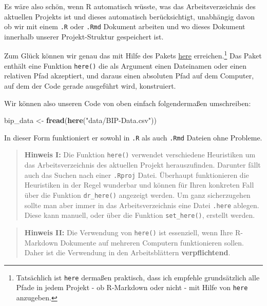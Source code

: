 \documentclass[]{tufte-book}
\newenvironment{Shaded}{}{}
\newcommand{\KeywordTok}[1]{\textcolor[rgb]{0.00,0.44,0.13}{\textbf{#1}}}
\newcommand{\StringTok}[1]{\textcolor[rgb]{0.25,0.44,0.63}{#1}}
\newcommand{\NormalTok}[1]{#1}
\begin{document}
Es wäre also schön, wenn R automatisch wüsste, was das
Arbeitsverzeichnis des aktuellen Projekts ist und dieses automatisch
berücksichtigt, unabhängig davon ob wir mit einem \texttt{.R} oder
\texttt{.Rmd} Dokument arbeiten und wo dieses Dokument innerhalb unserer
Projekt-Struktur gespeichert ist.

Zum Glück können wir genau das mit Hilfe des Pakets
\href{https://github.com/jennybc/here_here}{here} erreichen.\footnote{Tatsächlich
  ist \texttt{here} dermaßen praktisch, dass ich empfehle grundsätzlich
  alle Pfade in jedem Projekt - ob R-Markdown oder nicht - mit Hilfe von
  \texttt{here} anzugeben.} Das Paket enthält eine Funktion
\texttt{here()} die als Argument einen Dateinamen oder einen relativen
Pfad akzeptiert, und daraus einen absoluten Pfad auf dem Computer, auf
dem der Code gerade ausgeführt wird, konstruiert.

Wir können also unseren Code von oben einfach folgendermaßen
umschreiben:

\begin{Shaded}
\begin{Highlighting}[]
\NormalTok{bip_data <-}\StringTok{ }\KeywordTok{fread}\NormalTok{(}\KeywordTok{here}\NormalTok{(}\StringTok{"data/BIP-Data.csv"}\NormalTok{))}
\end{Highlighting}
\end{Shaded}

In dieser Form funktioniert er sowohl in \texttt{.R} als auch
\texttt{.Rmd} Dateien ohne Probleme.

\begin{quote}
\textbf{Hinweis I:} Die Funktion \texttt{here()} verwendet verschiedene
Heuristiken um das Arbeitsverzeichnis des aktuellen Projekt
herauszufinden. Darunter fällt auch das Suchen nach einer
\texttt{.Rproj} Datei. Überhaupt funktionieren die Heuristiken in der
Regel wunderbar und können für Ihren konkreten Fall über die Funktion
\texttt{dr\_here()} angezeigt werden. Um ganz sicherzugehen sollte man
aber immer in das Arbeitsverzeichnis eine Datei \texttt{.here} ablegen.
Diese kann manuell, oder über die Funktion \texttt{set\_here()},
erstellt werden.
\end{quote}

\begin{quote}
\textbf{Hinweis II:} Die Verwendung von \texttt{here()} ist essenziell,
wenn Ihre R-Markdown Dokumente auf mehreren Computern funktionieren
sollen. Daher ist die Verwendung in den Arbeitsblättern
\textbf{verpflichtend}.
\end{quote}
\end{document}
